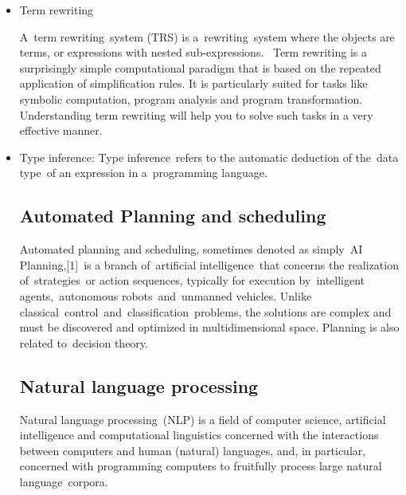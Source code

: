 \documentclass[14pt]{article}
\begin{document}
\begin{itemize}
\item Term rewriting

A term rewriting system (TRS) is a rewriting system where the objects are terms, or expressions with nested sub-expressions. 
Term rewriting is a surprisingly simple computational paradigm that is based on the repeated application of simplification rules. It is particularly suited for tasks like symbolic computation, program analysis and program transformation. Understanding term rewriting will help you to solve such tasks in a very effective manner.

\item Type inference: 
Type inference refers to the automatic deduction of the data type of an expression in a programming language.

\subsection{Automated Planning and scheduling}

Automated planning and scheduling, sometimes denoted as simply AI Planning,[1] is a branch of artificial intelligence that concerns the realization of strategies or action sequences, typically for execution by intelligent agents, autonomous robots and unmanned vehicles. Unlike classical control and classification problems, the solutions are complex and must be discovered and optimized in multidimensional space. Planning is also related to decision theory.


\subsection{Natural language processing}

Natural language processing (NLP) is a field of computer science, artificial intelligence and computational linguistics concerned with the interactions between computers and human (natural) languages, and, in particular, concerned with programming computers to fruitfully process large natural language corpora.

\end{itemize}
\newpage
\end{document}
